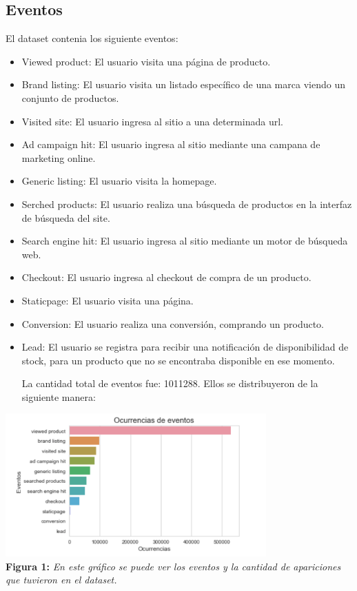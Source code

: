\documentclass[titlepage,a4paper]{article}
\begin{document}
	\subsection{Eventos}
	El dataset contenia los siguiente eventos: 
	\begin{itemize}
	\item Viewed product: El usuario visita una página de producto.
	\item Brand listing: El usuario visita un listado específico de una marca viendo un conjunto de productos.
	\item Visited site: El usuario ingresa al sitio a una determinada url.
	\item Ad campaign hit:  El usuario ingresa al sitio mediante una campana de marketing online.
	\item Generic listing:  El usuario visita la homepage.
	\item Serched products:  El usuario realiza una búsqueda de productos en la interfaz de búsqueda del site.
	\item Search engine hit: El usuario ingresa al sitio mediante un motor de búsqueda web.
	\item Checkout: El usuario ingresa al checkout de compra de un producto.
	\item Staticpage: El usuario visita una página.
	\item Conversion: El usuario realiza una conversión, comprando un producto.
	\item Lead: El usuario se registra para recibir una notificación de disponibilidad de stock, para un producto que no se encontraba disponible en ese momento.
	
	\newpage
	La cantidad total de eventos fue: 	1011288. Ellos se distribuyeron de la siguiente manera:
	\end{itemize}
	\begin{center}
	\includegraphics[width=10cm]{ocurrencia_eventos.jpg}\\
	\textbf{Figura 1:}  \textit{En este gráfico se puede ver los eventos y la cantidad de apariciones que tuvieron en el dataset. }
	\end{center}
\end{document}
